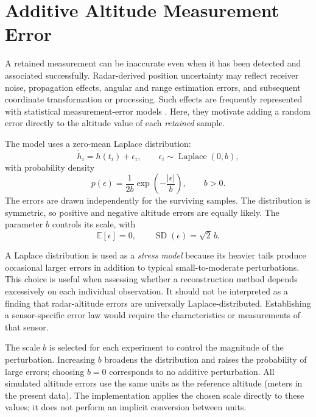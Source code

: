 \section{Additive Altitude Measurement Error}
\label{sec:noise-additive}

A retained measurement can be inaccurate even when it has
been detected and associated successfully. Radar-derived
position uncertainty may reflect receiver noise, propagation
effects, angular and range estimation errors, and subsequent
coordinate transformation or processing. Such effects are
frequently represented with statistical measurement-error
models \cite{barshalom2001estimation,eckert2020thesis}.
Here, they motivate adding a random error directly to
the altitude value of each \emph{retained} sample.

The model uses a zero-mean Laplace distribution:
\begin{equation}
    \widetilde{h}_i=h(t_i)+\epsilon_i,\qquad
    \epsilon_i\sim\operatorname{Laplace}(0,b),
    \label{eq:noise-additive-model}
\end{equation}
with probability density
\begin{equation}
    p(\epsilon)=\frac{1}{2b}
       \exp\left(-\frac{|\epsilon|}{b}\right),
    \qquad b>0.
    \label{eq:noise-laplace-pdf}
\end{equation}
The errors are drawn independently for the surviving
samples. The distribution is symmetric, so positive
and negative altitude errors are equally likely.
The parameter $b$ controls its scale, with
\begin{equation}
    \mathbb{E}[\epsilon]=0,\qquad
    \operatorname{SD}(\epsilon)=\sqrt{2}\,b.
    \label{eq:noise-laplace-spread}
\end{equation}

A Laplace distribution is used as a \emph{stress model}
because its heavier tails produce occasional larger
errors in addition to typical small-to-moderate
perturbations. This choice is useful when assessing
whether a reconstruction method depends excessively
on each individual observation. It should not be
interpreted as a finding that radar-altitude errors
are universally Laplace-distributed. Establishing
a sensor-specific error law would require the
characteristics or measurements of that sensor.

The scale $b$ is selected for each experiment to
control the magnitude of the perturbation.
Increasing $b$ broadens the distribution and
raises the probability of large errors; choosing
$b=0$ corresponds to no additive perturbation.
All simulated altitude errors use the same
units as the reference altitude (meters in
the present data). The implementation applies
the chosen scale directly to these values;
it does not perform an implicit conversion
between units.

